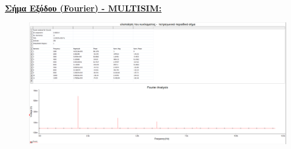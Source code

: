 \documentclass{article}
\begin{document}
{\begin{figure}[h!]
\end{figure} \\[1.4\baselineskip]
\textbf{\underline{Σήμα Εξόδου (Fourier) - MULTISIM:}}
\begin{figure}[h!]
\centering
 	\advance\leftskip-2cm
  \includegraphics[width=160mm,scale=2]{multisim8.png}
\end{figure} 
\clearpage










































































}
\end{document}
